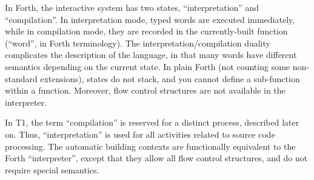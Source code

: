 \begin{rationale}
In Forth, the interactive system has two states, ``interpretation'' and
``compilation''. In interpretation mode, typed words are executed
immediately, while in compilation mode, they are recorded in the
currently-built function (``word'', in Forth terminology). The
interpretation/compilation duality complicates the description of the
language, in that many words have different semantics depending on the
current state. In plain Forth (not counting some non-standard
extensions), states do not stack, and you cannot define a sub-function
within a function. Moreover, flow control structures are not available
in the interpreter.

In T1, the term ``compilation'' is reserved for a distinct process,
described later on. Thus, ``interpretation'' is used for all activities
related to source code processing. The automatic building contexts are
functionally equivalent to the Forth ``interpreter'', except that they
allow all flow control structures, and do not require special semantics.
\end{rationale}

